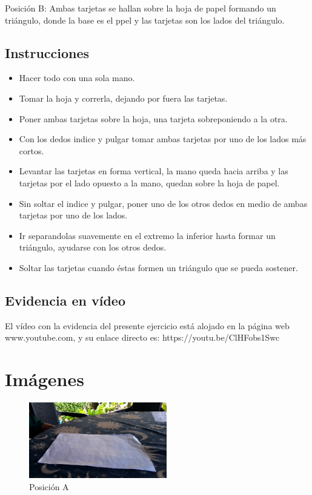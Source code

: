 ﻿\documentclass{article}
\begin{document}
\vspace{0.8cm}

Posición B: Ambas tarjetas se hallan sobre la hoja de papel formando un triángulo, donde la base es el ppel y las tarjetas son los lados del triángulo.

\subsection{Instrucciones}

\vspace{0.2cm}

\begin{itemize}
\item Hacer todo con una sola mano.
\item Tomar la hoja y correrla, dejando por fuera las tarjetas.
\item Poner ambas tarjetas sobre la hoja, una tarjeta sobreponiendo a la otra.
\item Con los dedos indice y pulgar tomar ambas tarjetas por uno de los lados más cortos.
\item Levantar las tarjetas en forma vertical, la mano queda hacia arriba y las tarjetas por el lado opuesto a la mano, quedan sobre la hoja de papel.
\item Sin soltar el indice y pulgar, poner uno de los otros dedos en medio de ambas tarjetas por uno de los lados.
\item Ir separandolas suavemente en el extremo la inferior hasta formar un triángulo, ayudarse con los otros dedos.
\item Soltar las tarjetas cuando éstas formen un triángulo que se pueda sostener.
\end{itemize}
\subsection{Evidencia en vídeo}
El vídeo con la evidencia del presente ejercicio está alojado en la página web www.youtube.com, y su enlace directo es:
https://youtu.be/ClHFobs1Swc

\newpage


\section{Imágenes} \label{imagenes}


\begin{figure}[h]
\includegraphics[width=6cm]{pos_a.png}
\centering
\caption{Posición A}
\label{fig:pos_a}
\end{figure}
\end{document}
